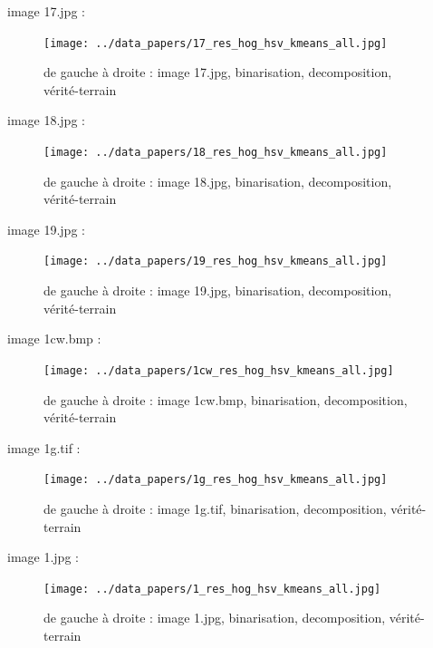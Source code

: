 \documentclass{book}
\begin{document}
image 17.jpg : 
\begin{figure}[H]
\begin{center}
\texttt{[image: ../data\_papers/17\_res\_hog\_hsv\_kmeans\_all.jpg]}
\end{center}
\caption{de gauche à droite : image 17.jpg, binarisation, decomposition, vérité-terrain}
\label{17}
\end{figure}
\clearpage


image 18.jpg : 
\begin{figure}[H]
\begin{center}
\texttt{[image: ../data\_papers/18\_res\_hog\_hsv\_kmeans\_all.jpg]}
\end{center}
\caption{de gauche à droite : image 18.jpg, binarisation, decomposition, vérité-terrain}
\label{18}
\end{figure}
\clearpage


image 19.jpg : 
\begin{figure}[H]
\begin{center}
\texttt{[image: ../data\_papers/19\_res\_hog\_hsv\_kmeans\_all.jpg]}
\end{center}
\caption{de gauche à droite : image 19.jpg, binarisation, decomposition, vérité-terrain}
\label{19}
\end{figure}
\clearpage


image 1cw.bmp : 
\begin{figure}[H]
\begin{center}
\texttt{[image: ../data\_papers/1cw\_res\_hog\_hsv\_kmeans\_all.jpg]}
\end{center}
\caption{de gauche à droite : image 1cw.bmp, binarisation, decomposition, vérité-terrain}
\label{1cw}
\end{figure}
\clearpage


image 1g.tif : 
\begin{figure}[H]
\begin{center}
\texttt{[image: ../data\_papers/1g\_res\_hog\_hsv\_kmeans\_all.jpg]}
\end{center}
\caption{de gauche à droite : image 1g.tif, binarisation, decomposition, vérité-terrain}
\label{1g}
\end{figure}
\clearpage


image 1.jpg : 
\begin{figure}[H]
\begin{center}
\texttt{[image: ../data\_papers/1\_res\_hog\_hsv\_kmeans\_all.jpg]}
\end{center}
\caption{de gauche à droite : image 1.jpg, binarisation, decomposition, vérité-terrain}
\label{1}
\end{figure}
\clearpage
\end{document}
